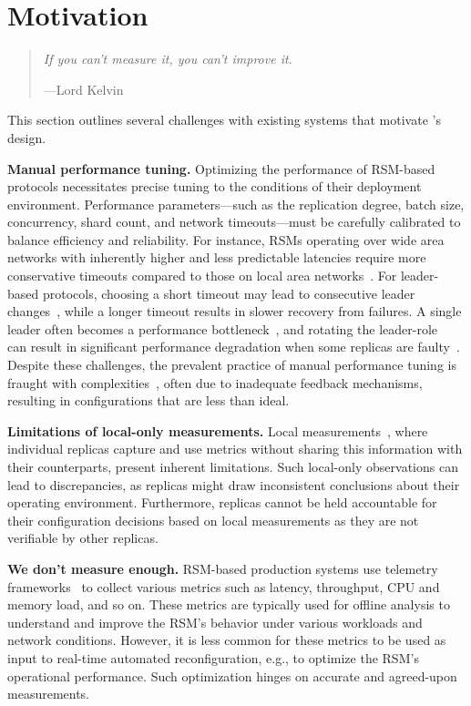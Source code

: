 \section{Motivation}
\label{sec:motivation}

\begin{quote}
\textit{If you can't measure it, you can't improve it.}

\hfill ---Lord Kelvin
\end{quote}

\noindent
This section outlines several challenges with existing systems that motivate \sysname's design.

\noindent\textbf{Manual performance tuning.}
Optimizing the performance of RSM-based protocols necessitates precise tuning to the conditions of their deployment environment.
Performance parameters---such as the replication degree, batch size, concurrency, shard count, and network timeouts---must be carefully calibrated to balance efficiency and reliability.
For instance, RSMs operating over wide area networks with inherently higher and less predictable latencies require more conservative timeouts compared to those on local area networks~\cite{quepaxa,atlas}.
For leader-based protocols, choosing a short timeout may lead to consecutive leader changes~\cite{mytumbler}, while a longer timeout results in slower recovery from failures.
A single leader often becomes a performance bottleneck~\cite{hovercraft,scalablesmr}, and rotating the leader-role~\cite{hotstuff} can result in significant performance degradation when some replicas are faulty~\cite{mytumbler,beegees}.
Despite these challenges, the prevalent practice of manual performance tuning is fraught with complexities~\cite{etcd-tuning}, often due to inadequate feedback mechanisms, resulting in configurations that are less than ideal.

\noindent\textbf{Limitations of local-only measurements.}
Local measurements~\cite{bft-smart,local1,local2,local3,local4}, where individual replicas capture and use metrics without sharing this information with their counterparts, present inherent limitations.
Such local-only observations can lead to discrepancies, as replicas might draw inconsistent conclusions about their operating environment.
Furthermore, replicas cannot be held accountable for their configuration decisions based on local measurements as they are not verifiable by other replicas.

\noindent\textbf{We don't measure enough.}
RSM-based production systems use telemetry frameworks~\cite{algorand, tendermint} to collect various metrics such as latency, throughput, CPU and memory load, and so on.
These metrics are typically used for offline analysis to understand and improve the RSM's behavior under various workloads and network conditions.
However, it is less common for these metrics to be used as input to real-time automated reconfiguration, e.g., to optimize the RSM's operational performance.
Such optimization hinges on accurate and agreed-upon measurements.

